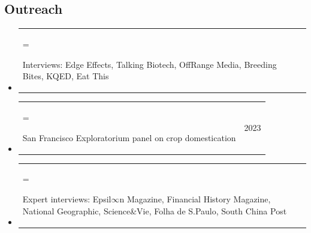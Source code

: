 \documentclass[letterpaper,10pt]{article}
\makeatletter
\newcommand{\ignore}[1]{}
\newlength{\cvhang}\setlength{\cvhang}{1.5em}
\newcommand{\cvitem}[3][\cvhang]{%
  \item\begin{tabularx}{\dimexpr\linewidth+\cvhang\relax}{@{}>{\hangindent=#1\hangafter=1\raggedright\arraybackslash}X@{\hspace{1.5em}}r@{}}
    #2 & #3
  \end{tabularx}%
}
\makeatother
\begin{document}
\subsection*{Outreach}
\begin{itemize}
\cvitem{Interviews: Edge Effects, Talking Biotech, OffRange Media, Breeding Bites, KQED, \newline Eat This}{}
\cvitem{San Francisco Exploratorium panel on crop domestication}{2023}
\cvitem{Expert interviews: \ignore{2025} Epsil$\infty$n Magazine, \ignore{2025} Financial History Magazine, \ignore{2024} National Geographic, \ignore{2023} Science\&Vie, \ignore{2023} Folha de S.Paulo, \ignore{2023} South China Post}{}
\end{itemize}

\end{document}
